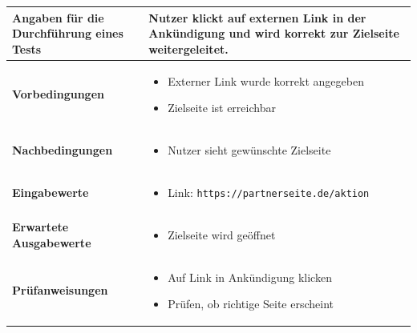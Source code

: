 \documentclass[a4paper,12pt]{article}
\begin{document}
\begin{center}
\begin{tabular}{|p{5cm}|p{10.5cm}|}
\hline
\textbf{Angaben für die Durchführung eines Tests} & Nutzer klickt auf externen Link in der Ankündigung und wird korrekt zur Zielseite weitergeleitet. \\
\hline
\textbf{Vorbedingungen} &
\begin{minipage}[t]{10.5cm}
\begin{itemize}[leftmargin=*]
  \item Externer Link wurde korrekt angegeben
  \item Zielseite ist erreichbar
\end{itemize}
\end{minipage} \\
\hline
\textbf{Nachbedingungen} &
\begin{minipage}[t]{10.5cm}
\begin{itemize}[leftmargin=*]
  \item Nutzer sieht gewünschte Zielseite
\end{itemize}
\end{minipage} \\
\hline
\textbf{Eingabewerte} & 
\begin{minipage}[t]{10.5cm}
\begin{itemize}[leftmargin=*]
  \item Link: \texttt{https://partnerseite.de/aktion}
\end{itemize}
\end{minipage} \\
\hline
\textbf{Erwartete Ausgabewerte} &
\begin{minipage}[t]{10.5cm}
\begin{itemize}[leftmargin=*]
  \item Zielseite wird geöffnet
\end{itemize}
\end{minipage} \\
\hline
\textbf{Prüfanweisungen} &
\begin{minipage}[t]{10.5cm}
\begin{itemize}[leftmargin=*]
  \item Auf Link in Ankündigung klicken
  \item Prüfen, ob richtige Seite erscheint
\end{itemize}
\end{minipage} \\
\hline
\end{tabular}
\end{center}
\end{document}
